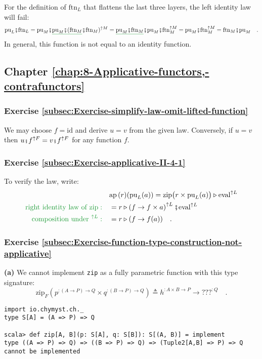 For the definition of $\text{ftn}_{L}$ that flattens the last three
layers, the left identity law will fail:
\[
\text{pu}_{L}\bef\text{ftn}_{L}=\text{pu}_{M}\bef\gunderline{\text{pu}_{M}\bef(\text{ftn}_{M}}\bef\text{ftn}_{M})^{\uparrow M}=\gunderline{\text{pu}_{M}\bef\text{ftn}_{M}}\bef\text{pu}_{M}\bef\text{ftn}_{M}^{\uparrow M}=\text{pu}_{M}\bef\text{ftn}_{M}^{\uparrow M}=\text{ftn}_{M}\bef\text{pu}_{M}\quad.
\]
In general, this function is not equal to an identity function.

\subsection*{Chapter \ref{chap:8-Applicative-functors,-contrafunctors}}

\subsubsection*{Exercise \ref{subsec:Exercise-simplify-law-omit-lifted-function}}

We may choose $f=\text{id}$ and derive $u=v$ from the given law.
Conversely, if $u=v$ then $u\bef f^{\uparrow F}=v\bef f^{\uparrow F}$
for any function $f$.

\subsubsection*{Exercise \ref{subsec:Exercise-applicative-II-4-1}}

To verify the law, write:
\begin{align*}
 & \text{ap}\,(r)(\text{pu}_{L}(a))=\text{zip}\big(r\times\text{pu}_{L}(a)\big)\triangleright\text{eval}^{\uparrow L}\\
{\color{greenunder}\text{right identity law of }\text{zip}:}\quad & =r\triangleright\left(f\rightarrow f\times a\right)^{\uparrow L}\bef\text{eval}^{\uparrow L}\\
{\color{greenunder}\text{composition under }^{\uparrow L}:}\quad & =r\triangleright(f\rightarrow f(a))\quad.
\end{align*}


\subsubsection*{Exercise \ref{subsec:Exercise-function-type-construction-not-applicative}}

\textbf{(a)} We cannot implement \lstinline!zip! as a fully parametric
function with this type signature:
\[
\text{zip}_{F}(p^{:(A\rightarrow P)\rightarrow Q}\times q^{:(B\rightarrow P)\rightarrow Q})\triangleq h^{:A\times B\rightarrow P}\rightarrow\text{???}^{:Q}\quad.
\]
\begin{lstlisting}
import io.chymyst.ch._
type S[A] = (A => P) => Q

scala> def zip[A, B](p: S[A], q: S[B]): S[(A, B)] = implement
type ((A => P) => Q) => ((B => P) => Q) => (Tuple2[A,B] => P) => Q cannot be implemented
\end{lstlisting}

